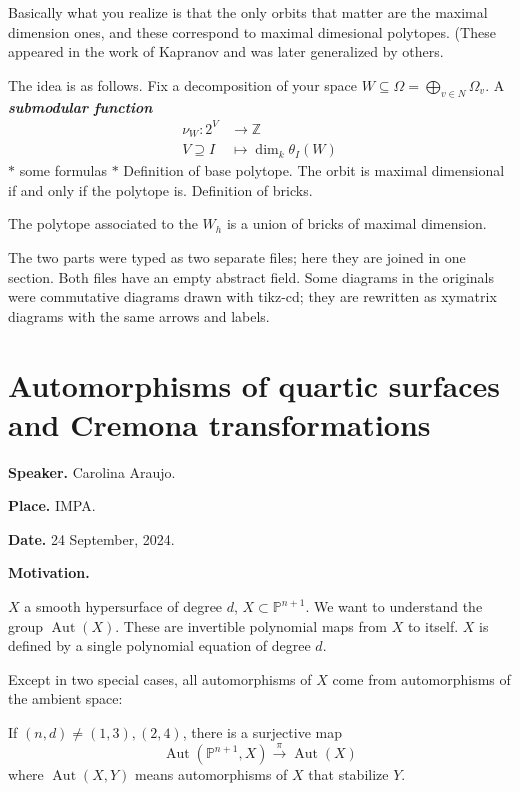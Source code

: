 \medskip{}

Basically what you realize is that the only
orbits that matter are the maximal dimension
ones, and these correspond to maximal
dimesional polytopes. (These appeared in the
work of Kapranov and was later generalized by
others.

The idea is as follows. Fix a decomposition
of your space $W\subseteq
\Omega=\bigoplus_{v\in N} \Omega_v $. A
\textit{\textbf{submodular function}}
$$
\begin{aligned}
\nu_W: 2^V &\longrightarrow \mathbb{Z} \\
V\supseteq I &\longmapsto \dim_k\theta_I(W)
\end{aligned}
$$
$*$ some formulas $*$ Definition of base
polytope. The orbit is maximal dimensional if
and only if the polytope is. Definition of
bricks.

\begin{theorem}
\label{theorem-esteves2-1}
The polytope associated to the $W_h$ is a
union of bricks of maximal dimension.
\end{theorem}

\medskip{} The
two parts were typed as two separate files;
here they are joined in one section. Both
files have an empty abstract field. Some
diagrams in the originals were commutative
diagrams drawn with tikz-cd; they are
rewritten as xymatrix diagrams with the same
arrows and labels.

\section{Automorphisms of quartic surfaces
and Cremona transformations}
\label{section-quartic-automorphisms}

\medskip\noindent
\textbf{Speaker.}
Carolina Araujo.

\medskip\noindent
\textbf{Place.}
IMPA.

\medskip\noindent
\textbf{Date.}
24 September, 2024.

\medskip\noindent
\textbf{Motivation.}

$X$ a smooth hypersurface of degree $d $,
$X\subset \mathbb{P}^{n+1}$. We want to
understand the group $\operatorname{Aut}(X)$.
These are invertible polynomial maps from $X$
to itself. $X$ is defined by a single
polynomial equation of degree $d$.

\begin{theorem}\leavevmode
	Except in two special cases, all
	automorphisms of $X$ come from automorphisms
	of the ambient space:
	
	If $(n,d)\neq (1,3),(2,4)$, there is a
	surjective map
	$$
	\operatorname{Aut}(\mathbb{P}^{n+1},X)
	\overset{\pi}{\longrightarrow}
	\operatorname{Aut}(X)
	$$
	where $\operatorname{Aut}(X,Y)$ means
	automorphisms of $X$ that stabilize  $Y$.
\end{theorem}

